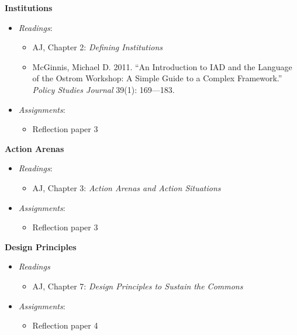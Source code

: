 \week \textbf{Institutions}

\begin{itemize}

\item
  \emph{Readings}:

  \begin{itemize}
  
  \item
    AJ, Chapter 2: \emph{Defining Institutions}
  \item
    McGinnis, Michael D. 2011. ``An Introduction to IAD and the Language
    of the Ostrom Workshop: A Simple Guide to a Complex Framework.''
    \emph{Policy Studies Journal} 39(1): 169---183.
  \end{itemize}
\item
  \emph{Assignments}:

  \begin{itemize}
  
  \item
    Reflection paper 3
  \end{itemize}
\end{itemize}

\week \textbf{Action Arenas}

\begin{itemize}

\item
  \emph{Readings}:

  \begin{itemize}
  
  \item
    AJ, Chapter 3: \emph{Action Arenas and Action Situations}
  \end{itemize}
\item
  \emph{Assignments}:

  \begin{itemize}
  
  \item
    Reflection paper 3
  \end{itemize}
\end{itemize}

\week \textbf{Design Principles}

\begin{itemize}

\item
  \emph{Readings}

  \begin{itemize}
  
  \item
    AJ, Chapter 7: \emph{Design Principles to Sustain the Commons}
  \end{itemize}
\item
  \emph{Assignments}:

  \begin{itemize}
  
  \item
    Reflection paper 4
  \end{itemize}
\end{itemize}

